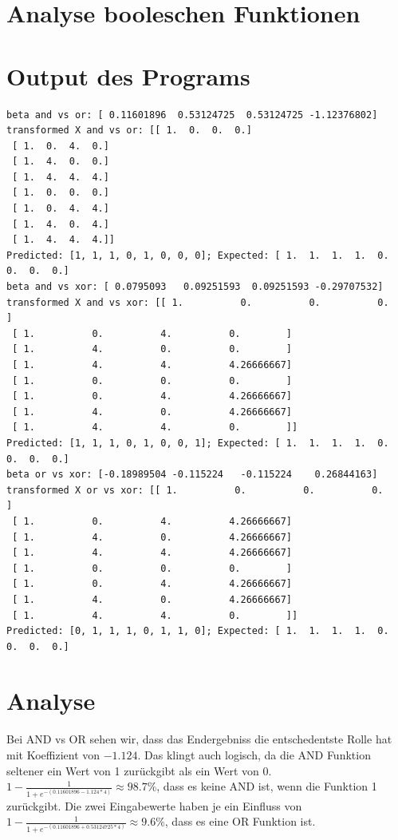 \section*{Analyse booleschen Funktionen}

\section*{Output des Programs}

\begin{lstlisting}
beta and vs or: [ 0.11601896  0.53124725  0.53124725 -1.12376802]
transformed X and vs or: [[ 1.  0.  0.  0.]
 [ 1.  0.  4.  0.]
 [ 1.  4.  0.  0.]
 [ 1.  4.  4.  4.]
 [ 1.  0.  0.  0.]
 [ 1.  0.  4.  4.]
 [ 1.  4.  0.  4.]
 [ 1.  4.  4.  4.]]
Predicted: [1, 1, 1, 0, 1, 0, 0, 0]; Expected: [ 1.  1.  1.  1.  0.  0.  0.  0.]
beta and vs xor: [ 0.0795093   0.09251593  0.09251593 -0.29707532]
transformed X and vs xor: [[ 1.          0.          0.          0.        ]
 [ 1.          0.          4.          0.        ]
 [ 1.          4.          0.          0.        ]
 [ 1.          4.          4.          4.26666667]
 [ 1.          0.          0.          0.        ]
 [ 1.          0.          4.          4.26666667]
 [ 1.          4.          0.          4.26666667]
 [ 1.          4.          4.          0.        ]]
Predicted: [1, 1, 1, 0, 1, 0, 0, 1]; Expected: [ 1.  1.  1.  1.  0.  0.  0.  0.]
beta or vs xor: [-0.18989504 -0.115224   -0.115224    0.26844163]
transformed X or vs xor: [[ 1.          0.          0.          0.        ]
 [ 1.          0.          4.          4.26666667]
 [ 1.          4.          0.          4.26666667]
 [ 1.          4.          4.          4.26666667]
 [ 1.          0.          0.          0.        ]
 [ 1.          0.          4.          4.26666667]
 [ 1.          4.          0.          4.26666667]
 [ 1.          4.          4.          0.        ]]
Predicted: [0, 1, 1, 1, 0, 1, 1, 0]; Expected: [ 1.  1.  1.  1.  0.  0.  0.  0.]
\end{lstlisting}

\section*{Analyse}

Bei AND vs OR sehen wir, dass das Endergebniss die entschedentste Rolle hat mit Koeffizient von $-1.124$. Das klingt auch
logisch, da die AND Funktion seltener ein Wert von 1 zurückgibt als ein Wert von 0.
$ 1 - \frac{1}{1 + e^{-(0.11601896 -1.124*4)}}  \approx 98.7\%$, dass es keine AND ist, wenn die Funktion 1 zurückgibt.
Die zwei Eingabewerte haben je ein Einfluss von $ 1 - \frac{1}{1 + e^{-(0.11601896 + 0.53124725*4)}}  \approx 9.6\%$,
dass es eine OR Funktion ist. \\\\

